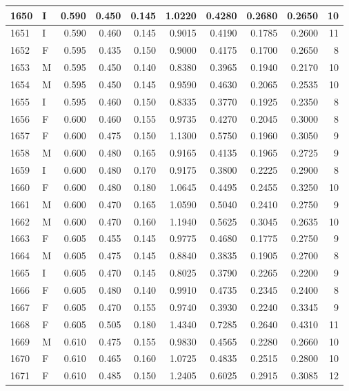 \documentclass[9pt,twocolumn,twoside,]{pnas-new}
\begin{document}
\begin{tabular}{l|l|r|r|r|r|r|r|r|r}
\hline
1650 & I & 0.590 & 0.450 & 0.145 & 1.0220 & 0.4280 & 0.2680 & 0.2650 & 10\\
\hline
1651 & I & 0.590 & 0.460 & 0.145 & 0.9015 & 0.4190 & 0.1785 & 0.2600 & 11\\
\hline
1652 & F & 0.595 & 0.435 & 0.150 & 0.9000 & 0.4175 & 0.1700 & 0.2650 & 8\\
\hline
1653 & M & 0.595 & 0.450 & 0.140 & 0.8380 & 0.3965 & 0.1940 & 0.2170 & 10\\
\hline
1654 & M & 0.595 & 0.450 & 0.145 & 0.9590 & 0.4630 & 0.2065 & 0.2535 & 10\\
\hline
1655 & I & 0.595 & 0.460 & 0.150 & 0.8335 & 0.3770 & 0.1925 & 0.2350 & 8\\
\hline
1656 & F & 0.600 & 0.460 & 0.155 & 0.9735 & 0.4270 & 0.2045 & 0.3000 & 8\\
\hline
1657 & F & 0.600 & 0.475 & 0.150 & 1.1300 & 0.5750 & 0.1960 & 0.3050 & 9\\
\hline
1658 & M & 0.600 & 0.480 & 0.165 & 0.9165 & 0.4135 & 0.1965 & 0.2725 & 9\\
\hline
1659 & I & 0.600 & 0.480 & 0.170 & 0.9175 & 0.3800 & 0.2225 & 0.2900 & 8\\
\hline
1660 & F & 0.600 & 0.480 & 0.180 & 1.0645 & 0.4495 & 0.2455 & 0.3250 & 10\\
\hline
1661 & M & 0.600 & 0.470 & 0.165 & 1.0590 & 0.5040 & 0.2410 & 0.2750 & 9\\
\hline
1662 & M & 0.600 & 0.470 & 0.160 & 1.1940 & 0.5625 & 0.3045 & 0.2635 & 10\\
\hline
1663 & F & 0.605 & 0.455 & 0.145 & 0.9775 & 0.4680 & 0.1775 & 0.2750 & 9\\
\hline
1664 & M & 0.605 & 0.475 & 0.145 & 0.8840 & 0.3835 & 0.1905 & 0.2700 & 8\\
\hline
1665 & I & 0.605 & 0.470 & 0.145 & 0.8025 & 0.3790 & 0.2265 & 0.2200 & 9\\
\hline
1666 & F & 0.605 & 0.480 & 0.140 & 0.9910 & 0.4735 & 0.2345 & 0.2400 & 8\\
\hline
1667 & F & 0.605 & 0.470 & 0.155 & 0.9740 & 0.3930 & 0.2240 & 0.3345 & 9\\
\hline
1668 & F & 0.605 & 0.505 & 0.180 & 1.4340 & 0.7285 & 0.2640 & 0.4310 & 11\\
\hline
1669 & M & 0.610 & 0.475 & 0.155 & 0.9830 & 0.4565 & 0.2280 & 0.2660 & 10\\
\hline
1670 & F & 0.610 & 0.465 & 0.160 & 1.0725 & 0.4835 & 0.2515 & 0.2800 & 10\\
\hline
1671 & F & 0.610 & 0.485 & 0.150 & 1.2405 & 0.6025 & 0.2915 & 0.3085 & 12\\

\end{tabular}
\end{document}
